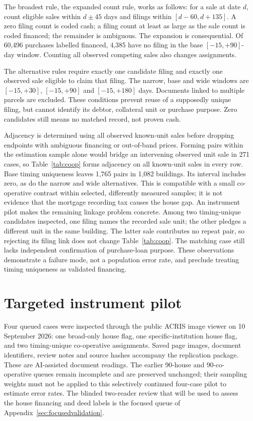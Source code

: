 \documentclass[12pt]{article}
\begin{document}
The broadest rule, the expanded count rule, works as follows: for a sale at date $d$, count eligible sales within $d\pm45$ days and filings within $[d-60,d+135]$. A zero filing count is coded cash; a filing count at least as large as the sale count is coded financed; the remainder is ambiguous. The expansion is consequential. Of 60,496 purchases labelled financed, 4,385 have no filing in the base $[-15,+90]$-day window. Counting all observed competing sales also changes assignments.

The alternative rules require exactly one candidate filing and exactly one observed sale eligible to claim that filing. The narrow, base and wide windows are $[-15,+30]$, $[-15,+90]$ and $[-15,+180]$ days. Documents linked to multiple parcels are excluded. These conditions prevent reuse of a supposedly unique filing, but cannot identify its debtor, collateral unit or purchase purpose. Zero candidates still means no matched record, not proven cash.

Adjacency is determined using all observed known-unit sales before dropping endpoints with ambiguous financing or out-of-band prices. Forming pairs within the estimation sample alone would bridge an intervening observed unit sale in 271 cases, so Table~\ref{tab:coop} forms adjacency on all known-unit sales in every row. Base timing uniqueness leaves 1,765 pairs in 1,082 buildings. Its interval includes zero, as do the narrow and wide alternatives. This is compatible with a small co-operative contrast within selected, differently measured samples; it is not evidence that the mortgage recording tax causes the house gap.
An instrument pilot makes the remaining linkage problem concrete. Among two timing-unique candidates inspected, one filing names the recorded sale unit; the other pledges a different unit in the same building. The latter sale contributes no repeat pair, so rejecting its filing link does not change Table~\ref{tab:coop}. The matching case still lacks independent confirmation of purchase-loan purpose. These observations demonstrate a failure mode, not a population error rate, and preclude treating timing uniqueness as validated financing.



\section{Targeted instrument pilot}\label{sec:pilot}
Four queued cases were inspected through the public ACRIS image viewer on 10 September 2026: one broad-only house flag, one specific-institution house flag, and two timing-unique co-operative assignments. Saved page images, document identifiers, review notes and source hashes accompany the replication package. These are AI-assisted document readings. The earlier 90-house and 90-co-operative queues remain incomplete and are preserved unchanged; their sampling weights must not be applied to this selectively continued four-case pilot to estimate error rates. The blinded two-reader review that will be used to assess the house financing and deed labels is the focused queue of Appendix~\ref{sec:focusedvalidation}.
\end{document}
